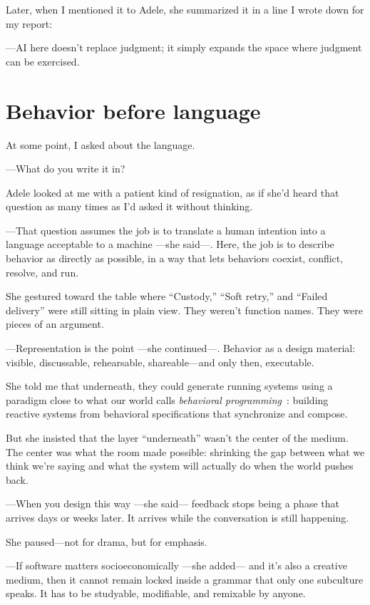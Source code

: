 \documentclass[11pt,a4paper]{article}
\begin{document}
Later, when I mentioned it to Adele, she summarized it in a line I wrote down
for my report:

---AI here doesn't replace judgment; it simply expands the space where
judgment can be exercised.

\section{Behavior before language}

At some point, I asked about the language.

---What do you write it in?

Adele looked at me with a patient kind of resignation, as if she'd heard that
question as many times as I'd asked it without thinking.

---That question assumes the job is to translate a human intention into a
language acceptable to a machine ---she said---. Here, the job is to describe
behavior as directly as possible, in a way that lets behaviors coexist,
conflict, resolve, and run.

She gestured toward the table where ``Custody,'' ``Soft retry,'' and ``Failed
delivery'' were still sitting in plain view. They weren't function names.
They were pieces of an argument.

---Representation is the point ---she continued---. Behavior as a design
material: visible, discussable, rehearsable, shareable---and only then,
executable.

She told me that underneath, they could generate running systems using a
paradigm close to what our world calls \emph{behavioral
programming}~\cite{harel}: building reactive systems from behavioral
specifications that synchronize and compose.

But she insisted that the layer ``underneath'' wasn't the center of the
medium. The center was what the room made possible: shrinking the gap between
what we think we're saying and what the system will actually do when the
world pushes back.

---When you design this way ---she said--- feedback stops being a phase that
arrives days or weeks later. It arrives while the conversation is still
happening.

She paused---not for drama, but for emphasis.

---If software matters socioeconomically ---she added--- and it's also a
creative medium, then it cannot remain locked inside a grammar that only one
subculture speaks. It has to be studyable, modifiable, and remixable by
anyone.
\end{document}
